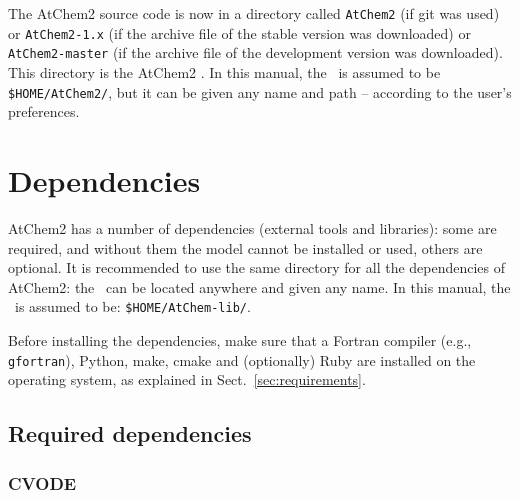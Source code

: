 The AtChem2 source code is now in a directory called \texttt{AtChem2}
(if git was used) or \texttt{AtChem2-1.x} (if the archive file of the
stable version was downloaded) or \texttt{AtChem2-master} (if the
archive file of the development version was downloaded). This
directory is the AtChem2 \maindir. In this manual, the \maindir\ is
assumed to be \texttt{\$HOME/AtChem2/}, but it can be given any name
and path -- according to the user's preferences.

\section{Dependencies} \label{sec:dependencies}

AtChem2 has a number of dependencies (external tools and libraries):
some are required, and without them the model cannot be installed or
used, others are optional. It is recommended to use the same directory
for all the dependencies of AtChem2: the \depdir\ can be located
anywhere and given any name. In this manual, the \depdir\ is
assumed to be: \texttt{\$HOME/AtChem-lib/}.

Before installing the dependencies, make sure that a Fortran compiler
(e.g., \texttt{gfortran}), Python, make, cmake and (optionally) Ruby
are installed on the operating system, as explained in
Sect.~\ref{sec:requirements}.

\subsection{Required dependencies} \label{subsec:required-dependencies}



\subsubsection{CVODE}

